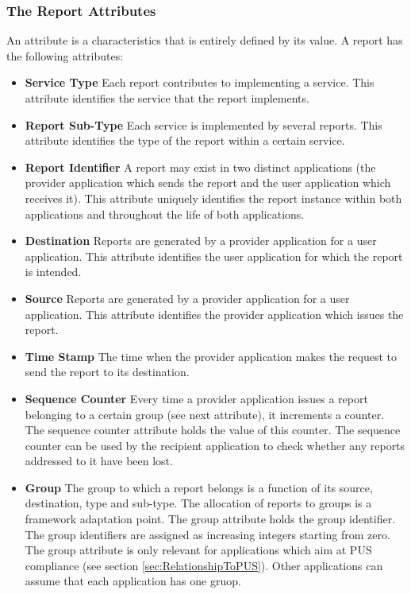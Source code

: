 \subsubsection{The Report Attributes}\label{sec:RepAttributes}

An attribute is a characteristics that is entirely defined by its value. A report has the following attributes:

\begin{itemize}
\item \textbf{Service Type}
Each report contributes to implementing a service. This attribute identifies the service that the report implements. 
\item \textbf{Report Sub-Type}
Each service is implemented by several reports. This attribute identifies the type of the report within a certain service. 
\item \textbf{Report Identifier}
A report may exist in two distinct applications (the provider application which sends the report and the user application which receives it). This attribute uniquely identifies the report instance within both applications and throughout the life of both applications.
\item \textbf{Destination}
Reports are generated by a provider application for a user application. This attribute identifies the user application for which the report is intended.
\item \textbf{Source}
Reports are generated by a provider application for a user application. This attribute identifies the provider application which issues the report.
\item \textbf{Time Stamp}
The time when the provider application makes the request to send the report to its destination.

\item \textbf{Sequence Counter}
Every time a provider application issues a report belonging to a certain group (see next attribute), it increments a counter. The sequence counter attribute holds the value of this counter. The sequence counter can be used by the recipient application to check whether any reports addressed to it have been lost.
 
\item \textbf{Group}
The group to which a report belongs is a function of its source, destination, type and sub-type. The allocation of reports to groups is a framework adaptation point. The group attribute holds the group identifier. The group identifiers are assigned as increasing integers starting from zero. The group attribute is only relevant for applications which aim at PUS compliance (see section \ref{sec:RelationshipToPUS}). Other applications can assume that each application has one gruop.


\end{itemize}
